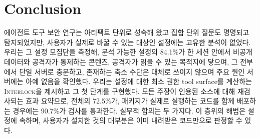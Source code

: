 \documentclass[acmsmall,screen,review,anonymous]{acmart}
\begin{document}
\section{Conclusion}
\label{sec:conclusion}

에이전트 도구 보안 연구는 아티팩트 단위로 성숙해 왔고 집합 단위 질문도 명명되고 탐지되었지만, 사용자가 실제로 바꿀 수 있는 대상인 설정에는 고유한 분석이 없었다. 우리는 그 설정 모집단을 측정해, 분석 가능한 설정의 84.1\%가 한 세션 안에서 비공개 데이터와 공격자가 통제하는 콘텐츠, 공격자가 읽을 수 있는 목적지에 닿으며, 그 전부에서 단일 서버로 충분하고, 존재하는 축소 수단은 대체로 쓰이지 않으며 주요 원인 서버에는 아예 없음을 확인했다. 우리는 설정에 대한 최소 권한 tool surface를 계산하는 \textsc{Interlock}을 제시하고 그 첫 단계를 구현했다. 모든 주장이 인용된 소스에 대해 재검사되는 효과 요약으로, 전체의 72.5\%가, 패키지가 실제로 실행하는 코드를 함께 배포하는 경우에는 90.7\%가 검사를 통과한다. 실무적 함의는 두 가지다. 이 층위의 해법은 설정에 속하며, 사용자가 설치한 것의 대부분은 이미 내려받은 코드만으로 판정할 수 있다.



\end{document}
